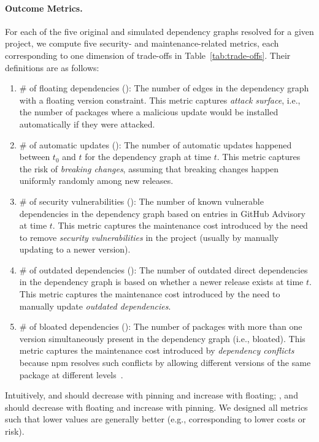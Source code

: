 \paragraph{Outcome Metrics.}
For each of the five original and simulated dependency graphs resolved for a given project, we compute five security- and maintenance-related metrics, each corresponding to one dimension of trade-offs in Table~\ref{tab:trade-offs}.
Their definitions are as follows:
\begin{enumerate}[leftmargin=20pt]
    \item \textsf{\# of floating dependencies} ():  The number of edges in the dependency graph with a floating version constraint. This metric captures \textit{attack surface}, i.e., the number of packages where a malicious update would be installed automatically if they were attacked.
    \item \textsf{\# of automatic updates} ():  The number of automatic updates happened between $t_0$ and $t$ for the dependency graph at time $t$. This metric captures the risk of \emph{breaking changes}, assuming that breaking changes happen uniformly randomly among new releases.
    \item \textsf{\# of security vulnerabilities} (): The number of known vulnerable dependencies in the dependency graph based on entries in GitHub Advisory~\cite{github-adv} at time $t$. This metric captures the maintenance cost introduced by the need to remove \emph{security vulnerabilities} in the project (usually by manually updating to a newer version). 
    \item \textsf{\# of outdated dependencies} ():  The number of outdated direct dependencies in the dependency graph is based on whether a newer release exists at time $t$. This metric captures the maintenance cost introduced by the need to manually update \emph{outdated dependencies}. 
    \item \textsf{\# of bloated dependencies} ():   The number of packages with more than one version simultaneously present in the dependency graph (i.e., bloated). This metric captures the maintenance cost introduced by \emph{dependency conflicts} because npm resolves such conflicts by allowing different versions of the same package at different levels~\cite{how-npm3-works}.
\end{enumerate}
Intuitively,   and  should decrease with pinning and increase with floating;
,  and  should decrease with floating and increase with pinning. We designed all metrics such that lower values are generally better (e.g., corresponding to lower costs or risk).

